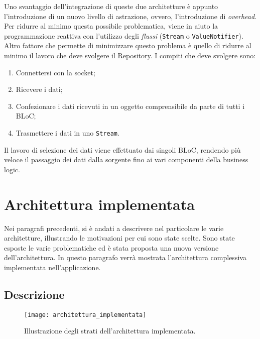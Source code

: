 Uno svantaggio dell'integrazione di queste due architetture è appunto l'introduzione di un nuovo livello di astrazione, ovvero, l'introduzione di \textit{overhead}. Per ridurre al minimo questa possibile problematica, viene in aiuto la programmazione reattiva con l'utilizzo degli \textit{flussi} (\verb|Stream| o \verb|ValueNotifier|). Altro fattore che permette di minimizzare questo problema è quello di ridurre al minimo il lavoro che deve svolgere il Repository. I compiti che deve svolgere sono:
\begin{enumerate}
	\item Connettersi con la socket;
	\item Ricevere i dati;
	\item Confezionare i dati ricevuti in un oggetto comprensibile da parte di tutti i BLoC;
	\item Trasmettere i dati in uno \verb|Stream|.
\end{enumerate}

Il lavoro di selezione dei dati viene effettuato dai singoli BLoC, rendendo più veloce il passaggio dei dati dalla sorgente fino ai vari componenti della business logic.

\section{Architettura implementata}
\label{architettura implementata}
Nei paragrafi precedenti, si è andati a descrivere nel particolare le varie architetture, illustrando le motivazioni per cui sono state scelte. Sono state esposte le varie problematiche ed è stata proposta una nuova versione dell'architettura. In questo paragrafo verrà mostrata l'architettura complessiva implementata nell'applicazione.

\subsection{Descrizione}
\begin{figure}
	\begin{center}
		\texttt{[image: architettura\_implementata]}
		\caption[Architettura implementata]{Illustrazione degli strati dell'architettura implementata.}
		\label{figura:architettura_implementata}
	\end{center}
\end{figure}

